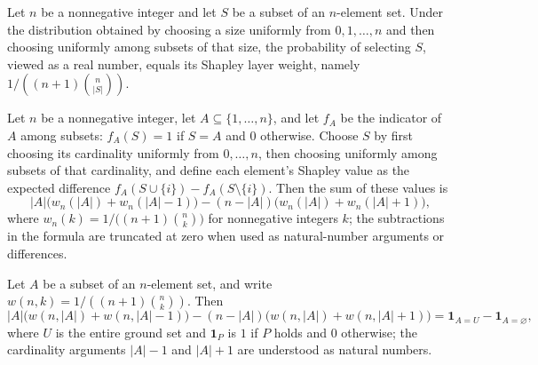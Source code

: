 \begin{theorem}
\label{FABL.shapleySubsetPMF_apply_toReal_eq_layerWeight}
\leanok
{}
Let $n$ be a nonnegative integer and let $S$ be a subset of an $n$-element set. Under
the distribution obtained by choosing a size uniformly from $0,1,\ldots,n$ and then
choosing uniformly among subsets of that size, the probability of selecting $S$, viewed
as a real number, equals its Shapley layer weight, namely $1/((n+1)\binom{n}{|S|})$.
\end{theorem}

\begin{theorem}
\label{FABL.sum_shapleyValue_subsetPointIndicator_eq_layerExpression}
\leanok
{}
Let $n$ be a nonnegative integer, let $A\subseteq\{1,\ldots,n\}$, and let $f_A$ be the
indicator of $A$ among subsets: $f_A(S)=1$ if $S=A$ and $0$ otherwise. Choose $S$ by
first choosing its cardinality uniformly from $0,\ldots,n$, then choosing uniformly
among subsets of that cardinality, and define each element's Shapley value as the
expected difference $f_A(S\cup\{i\})-f_A(S\setminus\{i\})$. Then the sum of these values
is
\[
|A|\bigl(w_n(|A|)+w_n(|A|-1)\bigr)-(n-|A|)\bigl(w_n(|A|)+w_n(|A|+1)\bigr),
\]
where $w_n(k)=1/\bigl((n+1)\binom{n}{k}\bigr)$ for nonnegative integers $k$; the
subtractions in the formula are truncated at zero when used as natural-number arguments
or differences.
\end{theorem}

\begin{theorem}
\label{FABL.shapleyLayerExpression_eq_endpointIndicators}
\leanok
{}
Let $A$ be a subset of an $n$-element set, and write $w(n,k)=1/((n+1)\binom{n}{k})$.
Then
\[
|A|\bigl(w(n,|A|)+w(n,|A|-1)\bigr)-(n-|A|)\bigl(w(n,|A|)+w(n,|A|+1)\bigr)=\mathbf{1}_{A=U}-\mathbf{1}_{A=\varnothing},
\]
where $U$ is the entire ground set and $\mathbf{1}_P$ is $1$ if $P$ holds and $0$
otherwise; the cardinality arguments $|A|-1$ and $|A|+1$ are understood as natural
numbers.
\end{theorem}

